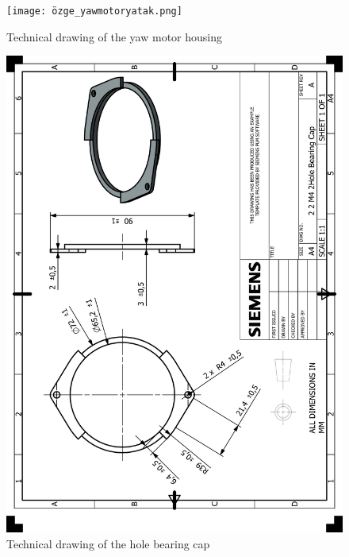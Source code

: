 \documentclass[12pt]{article}
\begin{document}
\begin{appendices}
\begin{figure}[H]
    \centering
    \texttt{[image: özge\_yawmotoryatak.png]} 
    \caption{Technical drawing of the yaw motor housing}
    \label{fig:technical-drawing}
\end{figure}

\begin{figure}[H]
    \centering
    \includegraphics[width=\textwidth]{HP_2 2 M4 2Hole Bearing Cap.png} 
    \caption{Technical drawing of the hole bearing cap}
    \label{fig:technical-drawing}
\end{figure}


\end{appendices}
\end{document}
